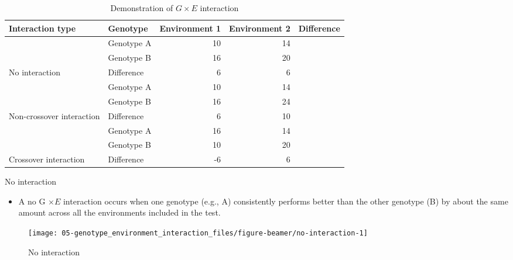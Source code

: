 \documentclass[11pt,dvipsnames,ignorenonframetext,aspectratio=169]{beamer}
\providecommand{\tightlist}{%
  \setlength{\itemsep}{0pt}\setlength{\parskip}{0pt}}
\begin{document}
\begin{frame}{}
\protect\hypertarget{section-3}{}

\begin{table}[t]

\caption{\label{tab:unnamed-chunk-1}Demonstration of $G \times E$ interaction}
\centering
\begin{tabular}{llrrl}
\toprule
Interaction type & Genotype & Environment 1 & Environment 2 & Difference\\
\midrule
 & Genotype A & 10 & 14 & \\

 & Genotype B & 16 & 20 & \\

\multirow[t]{-3}{*}{\raggedright\arraybackslash No interaction} & Difference & 6 & 6 & \\
\cmidrule{1-5}
 & Genotype A & 10 & 14 & \\

 & Genotype B & 16 & 24 & \\

\multirow[t]{-3}{*}{\raggedright\arraybackslash Non-crossover interaction} & Difference & 6 & 10 & \\
\cmidrule{1-5}
 & Genotype A & 16 & 14 & \\

 & Genotype B & 10 & 20 & \\

\multirow[t]{-3}{*}{\raggedright\arraybackslash Crossover interaction} & Difference & -6 & 6 & \\
\bottomrule
\end{tabular}
\end{table}

\end{frame}

\begin{frame}{No interaction}
\protect\hypertarget{no-interaction}{}

\begin{itemize}
\tightlist
\item
  A no G \(\times E\) interaction occurs when one genotype (e.g., A)
  consistently performs better than the other genotype (B) by about the
  same amount across all the environments included in the test.
\end{itemize}

\begin{figure}
\texttt{[image: 05-genotype\_environment\_interaction\_files/figure-beamer/no-interaction-1]} \caption{No interaction}\label{fig:no-interaction}
\end{figure}

\end{frame}
\end{document}
